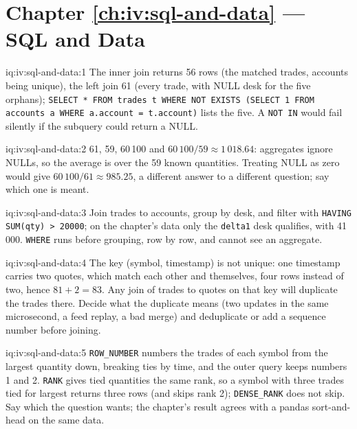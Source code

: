 \section*{Chapter \ref{ch:iv:sql-and-data} --- SQL and Data}

\begin{solution}{iq:iv:sql-and-data:1}
The inner join returns 56 rows (the matched trades, accounts being unique), the left join 61 (every trade, with NULL desk for the
five orphans); \texttt{SELECT * FROM trades t WHERE NOT EXISTS (SELECT 1 FROM accounts a WHERE a.account = t.account)} lists the five.
A \texttt{NOT IN} would fail silently if the subquery could return a NULL.
\end{solution}

\begin{solution}{iq:iv:sql-and-data:2}
61, 59, 60\,100 and $60\,100/59 \approx 1\,018.64$: aggregates ignore NULLs, so the average is over the 59 known quantities. Treating
NULL as zero would give $60\,100/61 \approx 985.25$, a different answer to a different question; say which one is meant.
\end{solution}

\begin{solution}{iq:iv:sql-and-data:3}
Join trades to accounts, group by desk, and filter with \texttt{HAVING SUM(qty) > 20000}; on the chapter's data only the
\texttt{delta1} desk qualifies, with 41\,000. \texttt{WHERE} runs before grouping, row by row, and cannot see an aggregate.
\end{solution}

\begin{solution}{iq:iv:sql-and-data:4}
The key (symbol, timestamp) is not unique: one timestamp carries two quotes, which match each other and themselves, four rows
instead of two, hence $81 + 2 = 83$. Any join of trades to quotes on that key will duplicate the trades there. Decide what the
duplicate means (two updates in the same microsecond, a feed replay, a bad merge) and deduplicate or add a sequence number before
joining.
\end{solution}

\begin{solution}{iq:iv:sql-and-data:5}
\texttt{ROW\_NUMBER} numbers the trades of each symbol from the largest quantity down, breaking ties by time, and the outer query keeps
numbers 1 and 2. \texttt{RANK} gives tied quantities the same rank, so a symbol with three trades tied for largest returns three rows
(and skips rank 2); \texttt{DENSE\_RANK} does not skip. Say which the question wants; the chapter's result agrees with a pandas
sort-and-head on the same data.
\end{solution}

